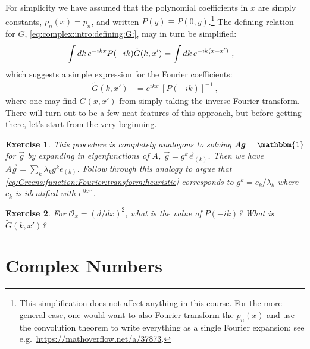 \documentclass[
  11pt,
	colorful,
	raggedright,
]{tufte-style-thesis-flip}
\newtheorem{exercise}{Exercise}[section]
\renewcommand{\dbar}{d\hspace*{-0.08em}\bar{}\hspace*{0.1em}}
\begin{document}
For simplicity we have assumed that the polynomial coefficients in $x$ are simply constants, $p_n(x) = p_n$, and written $P(y) \equiv P(0,y)$.\footnote{This simplification does not affect anything in this course. For the more general case, one would want to also Fourier transform the $p_n(x)$ and use the convolution theorem to write everything as a single Fourier expansion; see e.g.~\url{https://mathoverflow.net/a/37873}.}
The defining relation for $G$,
\eqref{eq:complex:intro:defining:G:}, may in turn be simplified:
\begin{align}
  \int \dbar k \, e^{-ikx} P(-ik) \tilde G(k,x') &= \int \dbar k \, e^{-ik(x-x')} \ ,
\end{align}
which suggests a simple expression for the Fourier coefficients:
\begin{align}
  \tilde G(k,x') &= e^{ikx'} \left[P(-ik)\right]^{-1} \ ,
  \label{eq:Greens:function:Fourier:transform:heuristic}
\end{align}
where one may find $G(x,x')$ from simply taking the inverse Fourier transform. There will turn out to be a few neat features of this approach, but before getting there, let's start from the very beginning.

\begin{exercise}
This procedure is completely analogous to solving $A \vec{g} = \mathbbm{1}$ for $\vec{g}$ by expanding in eigenfunctions of $A$, $\vec g = g^k \vec{e}_{(k)}$. Then we have $A\vec{g} = \sum_k \lambda_k g^k e_{(k)}$. Follow through this analogy to argue that \eqref{eq:Greens:function:Fourier:transform:heuristic} corresponds to $g^k = c_k/\lambda_k$ where $c_k$ is identified with $e^{ikx'}$.
\end{exercise}

\begin{exercise}
For $\mathcal O_x = (d/dx)^2$, what is the value of $P(-ik)$? What is $\tilde G(k,x')$?
\end{exercise}

\section{Complex Numbers}
\end{document}
